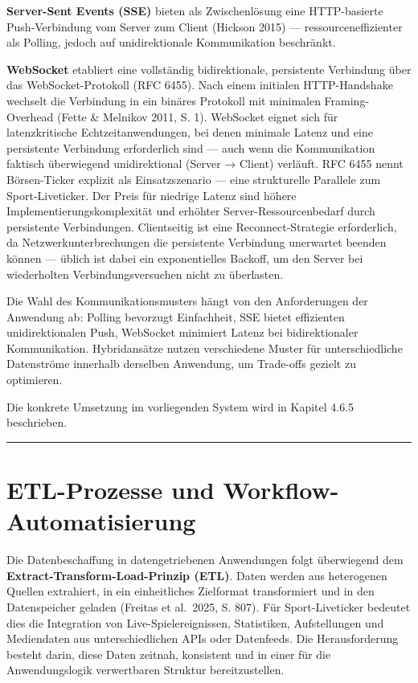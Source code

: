 \textbf{Server-Sent Events (SSE)} bieten als Zwischenlösung eine
HTTP-basierte Push-Verbindung vom Server zum Client (Hickson 2015) ---
ressourceneffizienter als Polling, jedoch auf unidirektionale
Kommunikation beschränkt.

\textbf{WebSocket} etabliert eine vollständig bidirektionale,
persistente Verbindung über das WebSocket-Protokoll (RFC 6455). Nach
einem initialen HTTP-Handshake wechselt die Verbindung in ein binäres
Protokoll mit minimalen Framing-Overhead (Fette \& Melnikov 2011, S. 1).
WebSocket eignet sich für latenzkritische Echtzeitanwendungen, bei denen
minimale Latenz und eine persistente Verbindung erforderlich sind ---
auch wenn die Kommunikation faktisch überwiegend unidirektional (Server
→ Client) verläuft. RFC 6455 nennt Börsen-Ticker explizit als
Einsatzszenario --- eine strukturelle Parallele zum Sport-Liveticker.
Der Preis für niedrige Latenz sind höhere Implementierungskomplexität
und erhöhter Server-Ressourcenbedarf durch persistente Verbindungen.
Clientseitig ist eine Reconnect-Strategie erforderlich, da
Netzwerkunterbrechungen die persistente Verbindung unerwartet beenden
können --- üblich ist dabei ein exponentielles Backoff, um den Server
bei wiederholten Verbindungsversuchen nicht zu überlasten.

Die Wahl des Kommunikationsmusters hängt von den Anforderungen der
Anwendung ab: Polling bevorzugt Einfachheit, SSE bietet effizienten
unidirektionalen Push, WebSocket minimiert Latenz bei bidirektionaler
Kommunikation. Hybridansätze nutzen verschiedene Muster für
unterschiedliche Datenströme innerhalb derselben Anwendung, um
Trade-offs gezielt zu optimieren.

Die konkrete Umsetzung im vorliegenden System wird in Kapitel 4.6.5
beschrieben.

\begin{center}\rule{0.5\linewidth}{0.5pt}\end{center}

\section{ETL-Prozesse und
Workflow-Automatisierung}\label{etl-prozesse-und-workflow-automatisierung}

Die Datenbeschaffung in datengetriebenen Anwendungen folgt überwiegend
dem \textbf{Extract-Transform-Load-Prinzip (ETL)}. Daten werden aus
heterogenen Quellen extrahiert, in ein einheitliches Zielformat
transformiert und in den Datenspeicher geladen (Freitas et al.~2025, S.
807). Für Sport-Liveticker bedeutet dies die Integration von
Live-Spielereignissen, Statistiken, Aufstellungen und Mediendaten aus
unterschiedlichen APIs oder Datenfeeds. Die Herausforderung besteht
darin, diese Daten zeitnah, konsistent und in einer für die
Anwendungslogik verwertbaren Struktur bereitzustellen.


